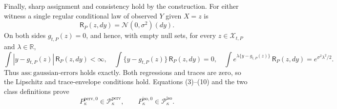 Finally, sharp assignment and consistency hold by the construction.  For
either witness a single regular conditional law of observed \(Y\) given
\(X=z\) is
\[
 \mathsf R_P(z,dy)=\mathcal N(0,\sigma^2)(dy).
\]
On both sides \(g_{t,P}(z)=0\), and hence, with empty null sets, for every
\(z\in\mathcal X_{t,P}\) and \(\lambda\in\mathbb R\),
\[
 \int |y-g_{t,P}(z)|\,\mathsf R_P(z,dy)<\infty,
 \quad
 \int\{y-g_{t,P}(z)\}\,\mathsf R_P(z,dy)=0,
 \quad
 \int e^{\lambda\{y-g_{t,P}(z)\}}\,\mathsf R_P(z,dy)
 =e^{\sigma^2\lambda^2/2}.
 \tag{10}
\]
Thus \(\mathrm{ass:gaussian\text{-}errors}\) holds exactly.  Both
regressions and traces are zero, so the Lipschitz and trace-envelope
conditions hold.  Equations (3)--(10) and the two class definitions prove
\[
 P_{\kappa}^{\mathrm{perv},0}\in\mathcal P_{\kappa}^{\mathrm{perv}},
 \qquad
 P_{\kappa}^{\mathrm{iso},0}\in\mathcal P_{\kappa}^{\mathrm{iso}}.
\]